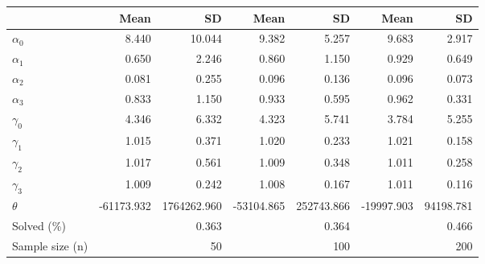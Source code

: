 
\begin{tabular}[t]{lrrrrrr}
\toprule
  & Mean & SD & Mean  & SD  & Mean   & SD  \\
\midrule
$\alpha_{0}$ & 8.440 & 10.044 & 9.382 & 5.257 & 9.683 & 2.917\\
$\alpha_{1}$ & 0.650 & 2.246 & 0.860 & 1.150 & 0.929 & 0.649\\
$\alpha_{2}$ & 0.081 & 0.255 & 0.096 & 0.136 & 0.096 & 0.073\\
$\alpha_{3}$ & 0.833 & 1.150 & 0.933 & 0.595 & 0.962 & 0.331\\
$\gamma_{0}$ & 4.346 & 6.332 & 4.323 & 5.741 & 3.784 & 5.255\\
$\gamma_{1}$ & 1.015 & 0.371 & 1.020 & 0.233 & 1.021 & 0.158\\
$\gamma_{2}$ & 1.017 & 0.561 & 1.009 & 0.348 & 1.011 & 0.258\\
$\gamma_{3}$ & 1.009 & 0.242 & 1.008 & 0.167 & 1.011 & 0.116\\
$\theta$ & -61173.932 & 1764262.960 & -53104.865 & 252743.866 & -19997.903 & 94198.781\\
Solved (\%) &  & 0.363 &  & 0.364 &  & 0.466\\
Sample size (n) &  & 50 &  & 100 &  & 200\\
\bottomrule
\end{tabular}
